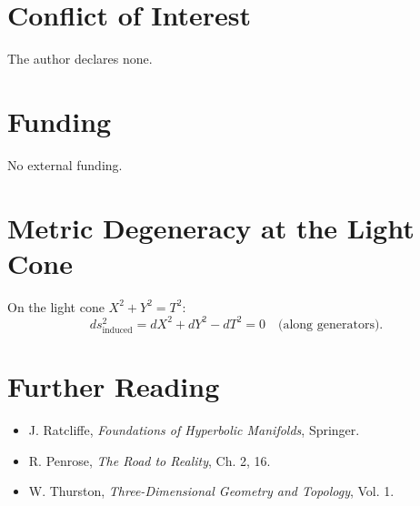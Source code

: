 \documentclass[10pt]{article}
\begin{document}
\section*{Conflict of Interest}
The author declares none.

\section*{Funding}
No external funding.

\appendix

\section{Metric Degeneracy at the Light Cone}
On the light cone $X^2 + Y^2 = T^2$:
\begin{equation*}
ds_{\text{induced}}^2 = dX^2 + dY^2 - dT^2 = 0 \quad \text{(along generators)}.
\end{equation*}

\section*{Further Reading}
\begin{itemize}
    \item J. Ratcliffe, \emph{Foundations of Hyperbolic Manifolds}, Springer.
    \item R. Penrose, \emph{The Road to Reality}, Ch. 2, 16.
    \item W. Thurston, \emph{Three-Dimensional Geometry and Topology}, Vol. 1.
\end{itemize}
\end{document}
